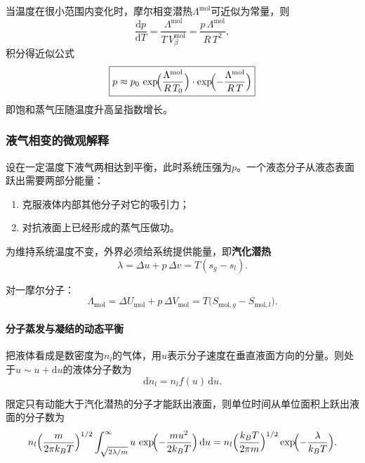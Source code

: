 \documentclass[UTF8]{ctexart}
\theoremstyle{definition}
\begin{document}
当温度在很小范围内变化时，摩尔相变潜热$\Lambda^{\mathrm{mol}}$可近似为常量，则
\begin{equation}
\frac{\mathrm{d}p}{\mathrm{d}T}
= \frac{\Lambda^{\mathrm{mol}}}{T\,V_\beta^{\mathrm{mol}}}
= \frac{p\,\Lambda^{\mathrm{mol}}}{R\,T^2},
\end{equation}
积分得近似公式
\begin{equation}
\boxed{p \approx p_0\,\exp\!\Bigl(\frac{\Lambda^{\mathrm{mol}}}{R\,T_0}\Bigr)\cdot\exp\!\Bigl(-\frac{\Lambda^{\mathrm{mol}}}{R\,T}\Bigr)}
\end{equation}
即饱和蒸气压随温度升高呈指数增长。

\subsubsection*{液气相变的微观解释}

设在一定温度下液气两相达到平衡，此时系统压强为$p$。一个液态分子从液态表面跃出需要两部分能量：
\begin{enumerate}
\item 克服液体内部其他分子对它的吸引力；
\item 对抗液面上已经形成的蒸气压做功。
\end{enumerate}

为维持系统温度不变，外界必须给系统提供能量，即\textbf{汽化潜热}
\begin{equation}
\lambda = \Delta u + p\,\Delta v = T(s_g-s_l).
\end{equation}

对一摩尔分子：
\begin{equation}
\Lambda_{\mathrm{mol}} = \Delta U_{\mathrm{mol}}+p\,\Delta V_{\mathrm{mol}}
= T\bigl(S_{\mathrm{mol},g}-S_{\mathrm{mol},l}\bigr).
\end{equation}

\paragraph{分子蒸发与凝结的动态平衡}

把液体看成是数密度为$n_l$的气体，用$u$表示分子速度在垂直液面方向的分量。则处于$u\sim u+\mathrm{d}u$的液体分子数为
\begin{equation}
\mathrm{d}n_l = n_l f(u)\,\mathrm{d}u.
\end{equation}

限定只有动能大于汽化潜热的分子才能跃出液面，则单位时间从单位面积上跃出液面的分子数为
\begin{equation}
n_l\Bigl(\frac{m}{2\pi k_BT}\Bigr)^{1/2}\int_{\sqrt{2\lambda/m}}^{\infty}
u\,\exp\!\Bigl(-\frac{mu^2}{2k_BT}\Bigr)\,\mathrm{d}u
= n_l\Bigl(\frac{k_BT}{2\pi m}\Bigr)^{1/2}\exp\!\Bigl(-\frac{\lambda}{k_BT}\Bigr).
\end{equation}
\end{document}
